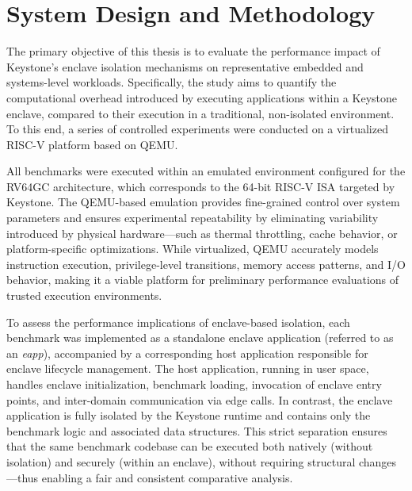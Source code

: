 \chapter{System Design and Methodology}
\label{chap:methodology}

The primary objective of this thesis is to evaluate the performance impact of Keystone’s enclave isolation mechanisms on representative embedded and systems-level workloads. Specifically, the study aims to quantify the computational overhead introduced by executing applications within a Keystone enclave, compared to their execution in a traditional, non-isolated environment. To this end, a series of controlled experiments were conducted on a virtualized RISC-V platform based on QEMU.

All benchmarks were executed within an emulated environment configured for the RV64GC architecture, which corresponds to the 64-bit RISC-V ISA targeted by Keystone. The QEMU-based emulation provides fine-grained control over system parameters and ensures experimental repeatability by eliminating variability introduced by physical hardware—such as thermal throttling, cache behavior, or platform-specific optimizations. While virtualized, QEMU accurately models instruction execution, privilege-level transitions, memory access patterns, and I/O behavior, making it a viable platform for preliminary performance evaluations of trusted execution environments.

To assess the performance implications of enclave-based isolation, each benchmark was implemented as a standalone enclave application (referred to as an \textit{eapp}), accompanied by a corresponding host application responsible for enclave lifecycle management. The host application, running in user space, handles enclave initialization, benchmark loading, invocation of enclave entry points, and inter-domain communication via edge calls. In contrast, the enclave application is fully isolated by the Keystone runtime and contains only the benchmark logic and associated data structures. This strict separation ensures that the same benchmark codebase can be executed both natively (without isolation) and securely (within an enclave), without requiring structural changes—thus enabling a fair and consistent comparative analysis.


